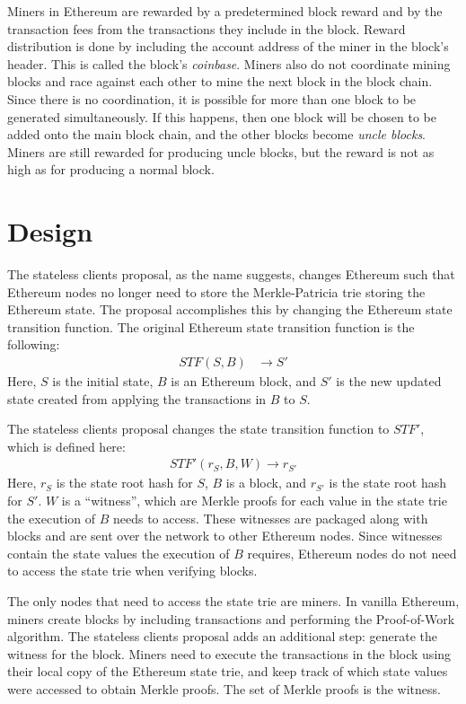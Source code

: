 \documentclass[12pt]{article}
\begin{document}
Miners in Ethereum are rewarded by a predetermined block reward and by the transaction fees from the transactions they include in the block. Reward distribution is done by including the account address of the miner in the block's header. This is called the block's \emph{coinbase}. Miners also do not coordinate mining blocks and race against each other to mine the next block in the block chain. Since there is no coordination, it is possible for more than one block to be generated simultaneously. If this happens, then one block will be chosen to be added onto the main block chain, and the other blocks become \emph{uncle blocks}. Miners are still rewarded for producing uncle blocks, but the reward is not as high as for producing a normal block.


\section{Design}

The stateless clients proposal, as the name suggests, changes Ethereum such that Ethereum nodes no longer need to store the Merkle-Patricia trie storing the Ethereum state. The proposal accomplishes this by changing the Ethereum state transition function. The original Ethereum state transition function is the following:
\begin{align*}
  STF(S, B) &\to S'
\end{align*}
Here, $S$ is the initial state, $B$ is an Ethereum block, and $S'$ is the new updated state created from applying the transactions in $B$ to $S$.

The stateless clients proposal changes the state transition function to $STF'$, which is defined here:
\begin{align*}
  STF'(r_S, B, W) \to r_{S'}
\end{align*}
Here, $r_S$ is the state root hash for $S$, $B$ is a block, and $r_{S'}$ is the state root hash for $S'$. $W$ is a ``witness'', which are Merkle proofs for each value in the state trie the execution of $B$ needs to access. These witnesses are packaged along with blocks and are sent over the network to other Ethereum nodes. Since witnesses contain the state values the execution of $B$ requires, Ethereum nodes do not need to access the state trie when verifying blocks.

The only nodes that need to access the state trie are miners. In vanilla Ethereum, miners create blocks by including transactions and performing the Proof-of-Work algorithm. The stateless clients proposal adds an additional step: generate the witness for the block. Miners need to execute the transactions in the block using their local copy of the Ethereum state trie, and keep track of which state values were accessed to obtain Merkle proofs. The set of Merkle proofs is the witness.
\end{document}
